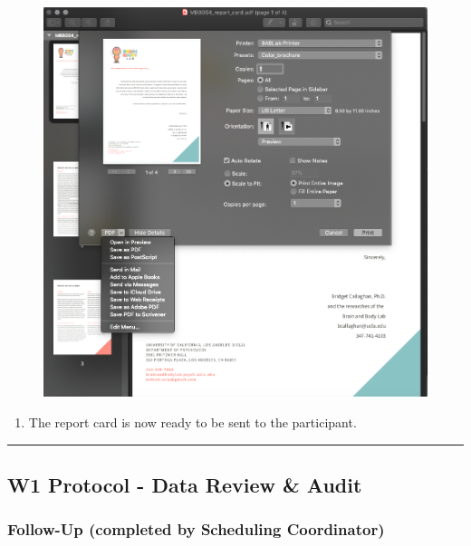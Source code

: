 \documentclass[]{book}
\providecommand{\tightlist}{%
  \setlength{\itemsep}{0pt}\setlength{\parskip}{0pt}}
\begin{document}
\begin{figure}
\centering
\includegraphics{images/final_checklist/report_cards/7.png}
\caption{}
\end{figure}

\begin{enumerate}
\def\labelenumi{\arabic{enumi}.}
\setcounter{enumi}{7}
\tightlist
\item
  The report card is now ready to be sent to the participant.
\end{enumerate}

\begin{center}\rule{0.5\linewidth}{0.5pt}\end{center}

\hypertarget{w1-protocol---data-review-audit}{%
\subsection{W1 Protocol - Data Review \& Audit}\label{w1-protocol---data-review-audit}}

\hypertarget{follow-up-completed-by-scheduling-coordinator}{%
\subsubsection{Follow-Up (completed by Scheduling Coordinator)}\label{follow-up-completed-by-scheduling-coordinator}}
\end{document}
